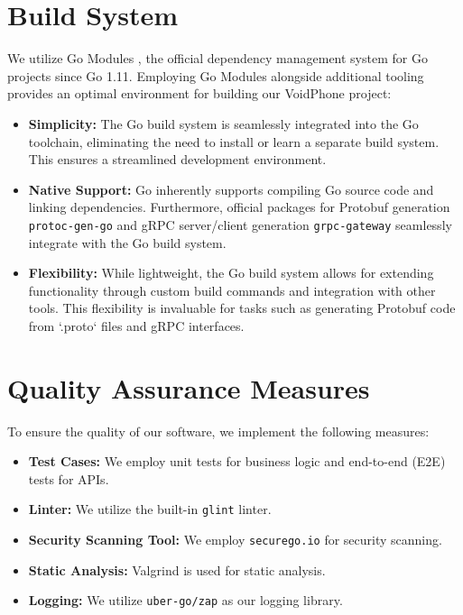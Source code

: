 \section{Build System}

We utilize Go Modules \parencite{usingGoModules}, the official dependency management system for Go projects since Go 1.11. Employing Go Modules alongside additional tooling provides an optimal environment for building our VoidPhone project:

\begin{itemize}
    \item \textbf{Simplicity:} The Go build system is seamlessly integrated into the Go toolchain, eliminating the need to install or learn a separate build system. This ensures a streamlined development environment.
    \item \textbf{Native Support:} Go inherently supports compiling Go source code and linking dependencies. Furthermore, official packages for Protobuf generation \texttt{protoc-gen-go} \parencite{protocGenGo} and gRPC server/client generation \texttt{grpc-gateway} \parencite{grpcGateway} seamlessly integrate with the Go build system.
    \item \textbf{Flexibility:} While lightweight, the Go build system allows for extending functionality through custom build commands and integration with other tools. This flexibility is invaluable for tasks such as generating Protobuf code from `.proto` files and gRPC interfaces.
\end{itemize}

\section{Quality Assurance Measures}
To ensure the quality of our software, we implement the following measures:
\begin{itemize}
    \item \textbf{Test Cases:} We employ unit tests for business logic and end-to-end (E2E) tests for APIs.
    \item \textbf{Linter:} We utilize the built-in \texttt{glint} linter.
    \item \textbf{Security Scanning Tool:} We employ \texttt{securego.io} for security scanning.
    \item \textbf{Static Analysis:} Valgrind is used for static analysis.
    \item \textbf{Logging:} We utilize \texttt{uber-go/zap} as our logging library.
\end{itemize}

